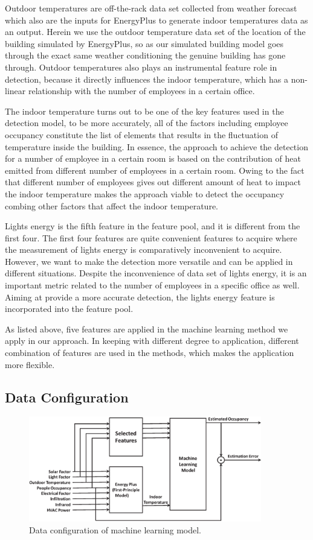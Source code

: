 Outdoor temperatures are off-the-rack data set collected from weather
forecast which also are the inputs for EnergyPlus to generate indoor
temperatures data as an output. Herein we use the outdoor
temperature data set of the location of the building simulated by EnergyPlus, so as
our simulated building model goes through the exact same weather
conditioning the genuine building has gone through. Outdoor
temperatures also plays an instrumental feature role in detection,
because it directly influences the indoor temperature, which has a
non-linear relationship with the number of employees in a certain
office.

The indoor temperature turns out to be one of the key features used in
the detection model, to be more accurately, all of the factors
including employee occupancy constitute the list of elements that
results in the fluctuation of temperature inside the building. In
essence, the approach to achieve the detection for a number of
employee in a certain room is based on the contribution of heat
emitted from different number of employees in a certain room. Owing to
the fact that different number of employees gives out different amount
of heat to impact the indoor temperature makes the approach viable to
detect the occupancy combing other factors that affect the indoor
temperature.

Lights energy is the fifth feature in the feature pool, and it is
different from the first four. The first four features are quite
convenient features to acquire where the measurement of lights energy
is comparatively inconvenient to acquire. However, we want to make the
detection more versatile and can be applied in different situations.
Despite the inconvenience of data set of lights energy, it is an
important metric related to the number of employees in a specific office
as well. Aiming at provide a more accurate detection, the lights
energy feature is incorporated into the feature pool.

As listed above, five features are applied in the machine learning
method we apply in our approach. In keeping with different degree to
application, different combination of features are used in the
methods, which makes the application more flexible.

\subsection{Data Configuration}
\begin{figure}[!h]
\centering
\includegraphics[width=4in]{./Pics/FlowDiagram2.eps}
\caption{Data configuration of machine learning model.}
\label{fig:SVRFlow}
\end{figure}

